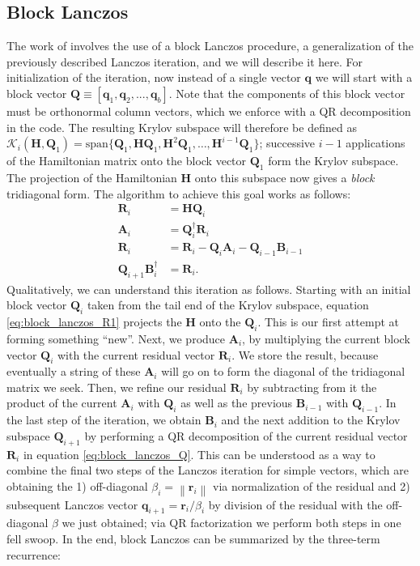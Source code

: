 \documentclass[12pt]{article} %
\begin{document}
\subsection{Block Lanczos}
The work of \citet{backhouse2023dynamics} involves the use of a block Lanczos procedure, a generalization of the previously described Lanczos iteration, and we will describe it here. For initialization of the iteration, now instead of a single vector $\mathbf{q}$ we will start with a block vector $\textbf{Q}\equiv [\mathbf{q}_1, \mathbf{q}_2, ... , \mathbf{q}_b]$. Note that the components of this block vector must be orthonormal column vectors, which we enforce with a QR decomposition in the code. The resulting Krylov subspace will therefore be defined as $\mathcal{K}_i(\textbf{H}, \textbf{Q}_1) = \text{span}\{\textbf{Q}_1, \mathbf{H}\textbf{Q}_1, \mathbf{H}^2\textbf{Q}_1,\ldots, \mathbf{H}^{i-1}\textbf{Q}_1\}$; successive $i-1$ applications of the Hamiltonian matrix onto the block vector $\textbf{Q}_1$ form the Krylov subspace. The projection of the Hamiltonian $\textbf{H}$ onto this subspace now gives a \emph{block} tridiagonal form. The algorithm to achieve this goal works as follows:
\begin{align}
\mathbf{R}_i & =\mathbf{H} \mathbf{Q}_i \label{eq:block_lanczos_R1} \\
\mathbf{A}_i & =\mathbf{Q}_i^{\dagger} \mathbf{R}_i \label{eq:block_lanczos_A} \\
\mathbf{R}_i & =\mathbf{R}_i-\mathbf{Q}_i \mathbf{A}_i-\mathbf{Q}_{i-1} \mathbf{B}_{i-1} \label{eq:block_lanczos_R2} \\
\mathbf{Q}_{i+1} \mathbf{B}_i^{\dagger} & =\mathbf{R}_i. \label{eq:block_lanczos_Q}
\end{align}
Qualitatively, we can understand this iteration as follows. Starting with an initial block vector $\mathbf{Q}_i$ taken from the tail end of the Krylov subspace, equation \ref{eq:block_lanczos_R1} projects the $\mathbf{H}$ onto the $\mathbf{Q}_i$. This is our first attempt at forming something ``new''. Next, we produce $\mathbf{A}_i$, by multiplying the current block vector $\mathbf{Q}_i$ with the current residual vector $\mathbf{R}_i$. We store the result, because eventually a string of these $\mathbf{A}_i$ will go on to form the diagonal of the tridiagonal matrix we seek. Then, we refine our residual $\mathbf{R}_i$ by subtracting from it the product of the current $\mathbf{A}_i$ with $\mathbf{Q}_i$ as well as the previous $\mathbf{B}_{i-1}$ with $\mathbf{Q}_{i-1}$. In the last step of the iteration, we obtain $\mathbf{B}_i$ and the next addition to the Krylov subspace $\mathbf{Q}_{i+1}$ by performing a QR decomposition of the current residual vector $\mathbf{R}_i$ in equation \ref{eq:block_lanczos_Q}. This can be understood as a way to combine the final two steps of the Lanczos iteration for simple vectors, which are obtaining the 1) off-diagonal $\beta_i =\left\|\mathbf{r}_i\right\|$ via normalization of the residual and 2) subsequent Lanczos vector $\mathbf{q}_{i+1} =\mathbf{r}_i / \beta_i$ by division of the residual with the off-diagonal $\beta$ we just obtained; via QR factorization we perform both steps in one fell swoop. In the end, block Lanczos can be summarized by the three-term recurrence:
\end{document}
